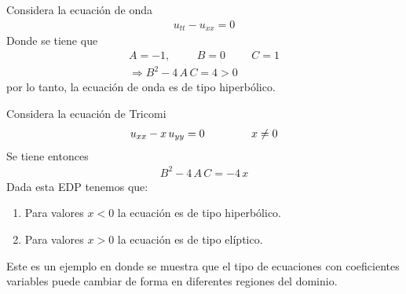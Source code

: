 \begin{ejemplo}
Considera la ecuación de onda
\begin{align*}
u_{tt} - u_{xx} = 0
\end{align*}
Donde se tiene que
\begin{align*}
A = -1, \hspace{1cm} B = 0 \hspace{1cm} C = 1 \\
\Rightarrow B^{2} - 4 \, A \, C = 4 > 0
\end{align*}
por lo tanto, la ecuación de onda es de tipo hiperbólico.
\end{ejemplo}
\begin{ejemplo}
Considera la ecuación de Tricomi
\begin{align*}
u_{xx} - x \, u_{yy} = 0 \hspace{1.5cm} x \neq 0
\end{align*}
Se tiene entonces
\begin{align*}
B^{2} - 4 \, A \, C = - 4 \, x
\end{align*}
Dada esta EDP tenemos que:
\begin{enumerate}
\item Para valores $x < 0$ la ecuación es de tipo hiperbólico.
\item Para valores $x > 0$ la ecuación es de tipo elíptico.
\end{enumerate}
Este es un ejemplo en donde se muestra que el tipo de ecuaciones con coeficientes variables puede cambiar de forma en diferentes regiones del dominio.
\end{ejemplo}
